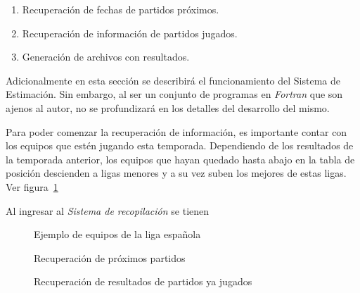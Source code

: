 \begin{enumerate}
	\item Recuperación de fechas de partidos próximos.
	\item Recuperación de información de partidos jugados.
	\item Generación de archivos con resultados.
\end{enumerate}


Adicionalmente en esta sección se describirá el funcionamiento del Sistema de Estimación. Sin embargo, al ser un conjunto de programas en \emph{Fortran} que son ajenos al autor, no se profundizará en los detalles del desarrollo del mismo.

Para poder comenzar la recuperación de información, es importante contar con los equipos que estén jugando esta temporada. Dependiendo de los resultados de la temporada anterior, los equipos que hayan quedado hasta abajo en la tabla de posición descienden a ligas menores y a su vez suben los mejores de estas ligas. Ver figura~\ref{Fig:los-equipos}

Al ingresar al \emph{Sistema de recopilación} se tienen 
 \cite{alfredo2005ingenieria}


\begin{figure}[!htb]\centering
   \begin {minipage}{1\textwidth}
     \caption[Ejemplo de equipos de la liga española]{Ejemplo de equipos de la liga española\footnotemark }\label{Fig:los-equipos}
   \end{minipage}
\end{figure}



\begin{figure}[!htb]\centering
   \begin {minipage}{1\textwidth}
     \caption{Recuperación de próximos partidos}\label{Fig:proximos-partidos}
   \end{minipage}
\end{figure}


\begin{figure}[!htb]\centering
   \begin {minipage}{1\textwidth}
     \caption{Recuperación de resultados de partidos ya jugados}\label{Fig:pasados-partidos}
   \end{minipage}
\end{figure}

